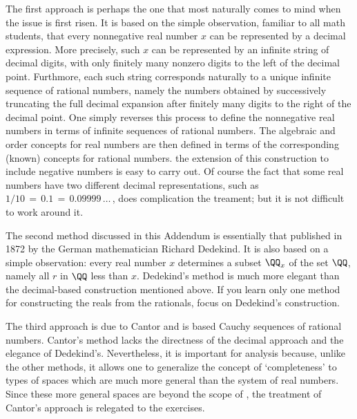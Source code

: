 {        The first approach is perhaps the one that most naturally comes to mind when the issue is first risen.
    It is based on the simple observation, familiar to all math students, that every nonnegative real number $x$ can be represented by a decimal expression.
    More precisely, such $x$ can be represented by an infinite string of decimal digits, with only finitely many nonzero digits to the left of the decimal point.
    Furthmore, each such string corresponds naturally to a unique infinite sequence of rational numbers,
    namely the numbers obtained by successively truncating the full decimal expansion after finitely many digits to the right of the decimal point.
    One simply reverses this process to define the nonnegative real numbers in terms of infinite sequences of rational numbers.
    The algebraic and order concepts for real numbers are then defined in terms of the corresponding (known) concepts for rational numbers.
    the extension of this construction to include negative numbers is easy to carry out.
    Of course the fact that some real numbers have two different decimal representations,
    such as $1/10 \,=\, 0.1 \,=\, 0.09999\,{\ldots}\,$, does complication the treament; but it is not difficult to work around it.



        The second method discussed in this Addendum is essentially that published in 1872 by the German mathematician Richard Dedekind.
    It is also based on a simple observation: every real number $x$ determines a subset ${\QQ}_{x}$ of the set ${\QQ}$, namely all $r$ in ${\QQ}$ less than $x$.
    Dedekind's method is much more elegant than the decimal-based construction mentioned above.
    If you learn only one method for constructing the reals from the rationals, focus on Dedekind's construction.


        The third approach is due to Cantor and is based Cauchy sequences of rational numbers.
    Cantor's method lacks the directness of the decimal approach and the elegance of Dedekind's.
    Nevertheless, it is important for analysis because, unlike the other methods,
    it allows one to generalize the concept of `completeness' to types of spaces which are much more general than the system of real numbers.
    Since these more general spaces are beyond the scope of {\ThisText}, the treatment of Cantor's approach is relegated to the exercises.%

\VV
}%

